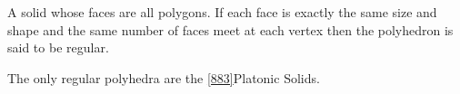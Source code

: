 A solid whose faces are all polygons.  
If each face is exactly the same size and shape and the same number of faces meet at each vertex then the polyhedron is said to be regular.  

\par
The only regular polyhedra are the \cref{883}{Platonic Solids}.    
